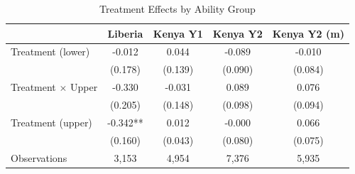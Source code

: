 \begin{table}[htbp]
\centering
\small
\caption{Treatment Effects by Ability Group}
\label{tab:upper_lower}
\begin{tabular}{l*{4}{c}}
\toprule
 & Liberia & Kenya Y1 & Kenya Y2 & Kenya Y2 (m) \\
\midrule
Treatment (lower) & -0.012 & 0.044 & -0.089 & -0.010 \\
 & (0.178) & (0.139) & (0.090) & (0.084) \\
\addlinespace
Treatment $\times$ Upper & -0.330 & -0.031 & 0.089 & 0.076 \\
 & (0.205) & (0.148) & (0.098) & (0.094) \\
\addlinespace
Treatment (upper) & -0.342** & 0.012 & -0.000 & 0.066 \\
 & (0.160) & (0.043) & (0.080) & (0.075) \\
\addlinespace\midrule
Observations & 3,153 & 4,954 & 7,376 & 5,935 \\
\bottomrule
\end{tabular}
\end{table}